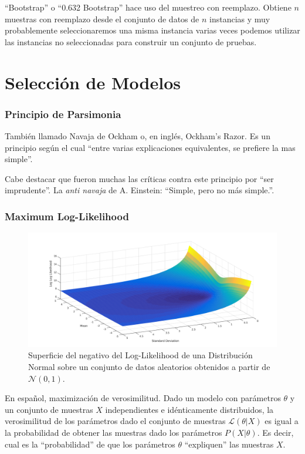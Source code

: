 \documentclass[10pt,a4paper]{article}
\begin{document}
``Bootstrap'' o ``0.632 Bootstrap'' hace uso del muestreo con reemplazo. Obtiene $n$ muestras con reemplazo desde el conjunto de datos de $n$ instancias y muy probablemente seleccionaremos una misma instancia varias veces podemos utilizar las instancias no seleccionadas para construir un conjunto de pruebas.


\part{Selección de Modelos}
\section{Principio de Parsimonia}
También llamado Navaja de Ockham o, en inglés, Ockham's Razor. Es un principio según el cual ``entre varias explicaciones equivalentes, se prefiere la mas simple''. 

Cabe destacar que fueron muchas las críticas contra este principio por ``ser imprudente''. La \textit{anti navaja} de A. Einstein: ``Simple, pero no más simple.''.

\section{Maximum Log-Likelihood}

\begin{figure}
  \centering
  \includegraphics[width=\textwidth]{llh/normal.pdf}
  \caption{Superficie del negativo del Log-Likelihood de una Distribución Normal sobre un conjunto de datos aleatorios obtenidos a partir de $\mathcal{N}(0, 1)$.}
  \label{fig:llhplot}
\end{figure}
En español, maximización de verosimilitud. Dado un modelo con parámetros $\theta$ y un conjunto de muestras $X$ independientes e idénticamente distribuidos, la verosimilitud de los parámetros dado el conjunto de muestras $\mathcal{L}(\theta|X)$ es igual a la probabilidad de obtener las muestras dado los parámetros $P(X|\theta)$. Es decir, cual es la ``probabilidad'' de que los parámetros $\theta$ ``expliquen'' las muestras $X$.
\end{document}
